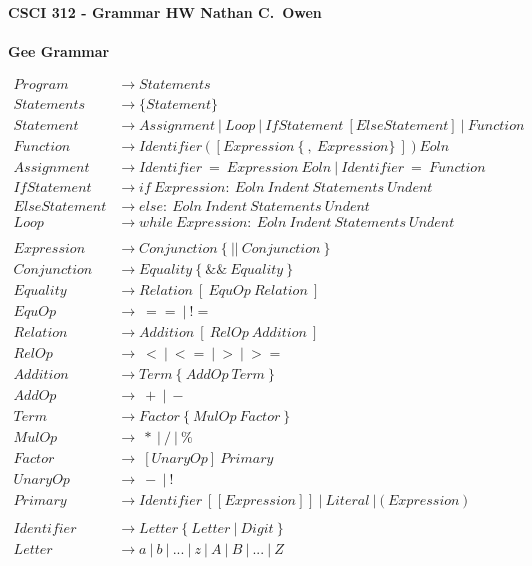 \documentclass[a4paper,9pt]{extarticle}
\begin{document}
\textbf{CSCI 312 - Grammar HW \hfill  Nathan C.~Owen} \\ \\
\textbf{Gee Grammar}

\begin{align*}
Program &\longrightarrow Statements \\
Statements &\longrightarrow \lbrace Statement\rbrace \\
Statement &\longrightarrow Assignment~|~Loop~|~IfStatement~[ElseStatement]~|~Function\\
Function &\longrightarrow Identifier~\textbf{(}~[Expression~\lbrace~,~Expression\rbrace~]~\textbf{)}~Eoln \\
Assignment &\longrightarrow Identifier~=~Expression~Eoln~|~Identifier~=~Function~\\
IfStatement &\longrightarrow if~Expression:~Eoln~Indent~Statements~Undent \\
ElseStatement &\longrightarrow else:~Eoln~Indent~Statements~Undent\\
Loop &\longrightarrow while~Expression:~Eoln~Indent~Statements~Undent \\
\\
Expression &\longrightarrow Conjunction~\lbrace~||~Conjunction~\rbrace\\
Conjunction &\longrightarrow Equality~\lbrace~\&\&~Equality~\rbrace\\
Equality &\longrightarrow Relation~[~EquOp~Relation~]\\
EquOp &\longrightarrow~==~|~!=\\
Relation &\longrightarrow Addition~[~RelOp~Addition~]\\
RelOp &\longrightarrow~<~|~<=~|~>~|~>=\\
Addition &\longrightarrow Term~\lbrace~AddOp~Term~\rbrace\\
AddOp &\longrightarrow~+~|~-\\
Term &\longrightarrow Factor~\lbrace~MulOp~Factor~\rbrace\\
MulOp &\longrightarrow~*~|~/~|~\%\\
Factor &\longrightarrow~[UnaryOp]~Primary\\
UnaryOp &\longrightarrow~-~|~!\\
Primary &\longrightarrow Identifier~[~\textbf{[}~Expression~\textbf{]}~]~|~Literal~|~\textbf{(}~Expression~\textbf{)}\\
\\
Identifier &\longrightarrow Letter~\lbrace~Letter~|~Digit~\rbrace\\
Letter &\longrightarrow a~|~b~|~...~|~z~|~A~|~B~|~...~|~Z\\

\end{align*}
\end{document}

